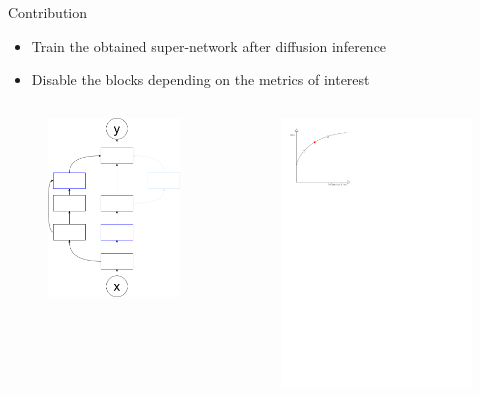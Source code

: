 \documentclass[aspectratio=169,xcolor=dvipsnames]{beamer}
\begin{document}
\begin{frame}{Contribution}
    \begin{itemize}
        \item Train the obtained super-network after diffusion inference
        \item Disable the blocks depending on the metrics of interest
    \end{itemize}
    \begin{columns}[c]
        \begin{figure}[htbp]
            \centering
            \includegraphics[width=.6\textwidth]{diagram_disabled1.drawio.png}
        \end{figure}
        \begin{figure}[htbp]
            \centering
            \includegraphics[width=.6\textwidth]{pareto_front_disabled1.pdf}
        \end{figure}
    \end{columns}
\end{frame}
\end{document}
